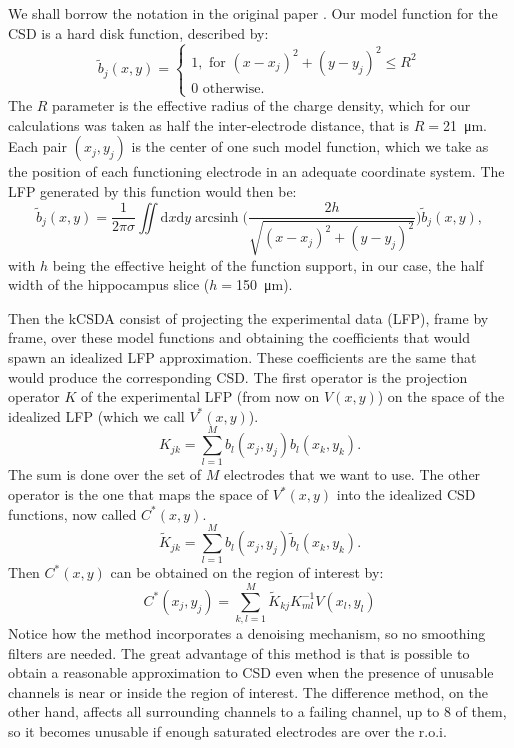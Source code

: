 \documentclass[11pt, letterpaper]{article}
\DeclareMathOperator{\arcsinh}{arcsinh}
\newcommand{\mum}[1]{\SI{#1}{\micro\metre}}
\newcommand{\rd}{\mathrm{d}}
\begin{document}
We shall borrow the notation in the original paper \cite{Potworowski2011}. Our model function for the CSD is a hard disk function, described by:
\begin{equation}
  \tilde{b}_j(x,y)=\begin{cases}
  1, \text{ for } (x-x_j)^2+(y-y_j)^2 \leq R^2 \\
  0 \text{ otherwise.} 
  \end{cases}
\end{equation}
The $R$ parameter is the effective radius of the charge density, which for our
calculations was taken as half the inter-electrode distance, that is $R=$\mum{21}.
Each pair $(x_j, y_j)$ is the center of one such model function, which we take as
the position of each  functioning electrode in an adequate coordinate system.
The LFP generated by this function would then be:
\begin{equation}
  \tilde{b}_j(x,y)=\frac{1}{2\pi\sigma}
  \iint \! \rd x \rd y \arcsinh \biggr(
  \frac{2 h } {\sqrt{(x-x_j)^2+(y-y_j)^2}}
  \biggl)
  \tilde{b}_j(x,y),
\end{equation}
  with $h$ being the effective height of the function support, in our case,
  the half width of the hippocampus slice ($h=$\mum{150}).

Then the kCSDA consist of projecting the experimental data (LFP), frame by frame,
over these model functions and obtaining the  coefficients that would spawn an idealized
LFP approximation. These coefficients are the same that would produce the
corresponding CSD. The first operator is the projection operator $K$ of the experimental
LFP (from now on $V(x,y)$) on the space of the idealized LFP (which we call $V^* (x,y)$).
\begin{equation}
  K_{jk}=\sum_{l=1}^{M}b_l(x_j,y_j)b_l(x_k,y_k).
\end{equation}
The sum is done over the set of $M$ electrodes that we want to use.
The other operator is the one that maps the space of $V^*(x,y)$ into the idealized
CSD functions, now called $C^*(x,y)$. 
\begin{equation}
  \tilde{K}_{jk}=\sum_{l=1}^Mb_l(x_j,y_j)\tilde{b}_l(x_k,y_k).
\end{equation}
Then $C^*(x,y)$ can be obtained on the region of interest by:
\begin{equation}
  C^*(x_j,y_j)=\sum_{k,l=1}^M \tilde{K}_{kj} K^{-1}_{ml} V(x_l,y_l)
\end{equation}
Notice how the method incorporates a denoising mechanism, so
no smoothing filters are needed.
The great advantage of this method is that is possible to obtain a reasonable
approximation to CSD even when the presence of unusable channels is near or inside
the region of interest. The difference method, on the other hand, affects all surrounding
channels to a failing channel, up to 8 of them, so it becomes unusable if enough
saturated electrodes are over the r.o.i.
\end{document}
